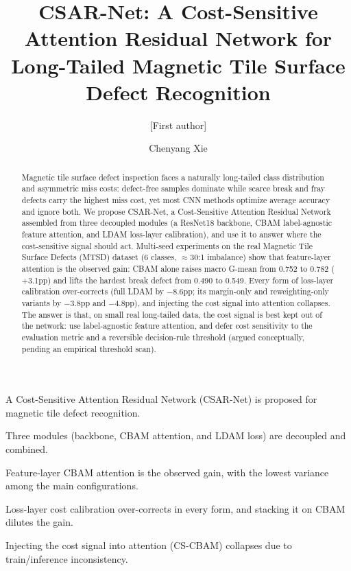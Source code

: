 \documentclass[a4paper,fleqn]{cas-sc}
\begin{document}
\begin{sloppypar}
	\let\WriteBookmarks\relax
	\def\floatpagefraction{0.7}
	\def\textfraction{0.05}
	\def\topfraction{0.85}
	\def\bottomfraction{0.85}
	\let\printorcid\relax

	\title [mode = title]{CSAR-Net: A Cost-Sensitive Attention Residual Network for Long-Tailed Magnetic Tile Surface Defect Recognition}

	\author[1]{[First author]}
	\cormark[1]

	\author[1]{Chenyang Xie}

	\address[1]{[Affiliation], China}


	\begin{abstract}
		Magnetic tile surface defect inspection faces a naturally long-tailed class distribution and asymmetric miss costs: defect-free samples dominate while scarce break and fray defects carry the highest miss cost, yet most CNN methods optimize average accuracy and ignore both. We propose CSAR-Net, a Cost-Sensitive Attention Residual Network assembled from three decoupled modules (a ResNet18 backbone, CBAM label-agnostic feature attention, and LDAM loss-layer calibration), and use it to answer where the cost-sensitive signal should act. Multi-seed experiments on the real Magnetic Tile Surface Defects (MTSD) dataset (6 classes, $\approx$30:1 imbalance) show that feature-layer attention is the observed gain: CBAM alone raises macro G-mean from 0.752 to 0.782 ($+$3.1pp) and lifts the hardest break defect from 0.490 to 0.549. Every form of loss-layer calibration over-corrects (full LDAM by $-$8.6pp; its margin-only and reweighting-only variants by $-$3.8pp and $-$4.8pp), and injecting the cost signal into attention collapses. The answer is that, on small real long-tailed data, the cost signal is best kept out of the network: use label-agnostic feature attention, and defer cost sensitivity to the evaluation metric and a reversible decision-rule threshold (argued conceptually, pending an empirical threshold scan).
	\end{abstract}

	\begin{highlights}
		\item A Cost-Sensitive Attention Residual Network (CSAR-Net) is proposed for magnetic tile defect recognition.
		\item Three modules (backbone, CBAM attention, and LDAM loss) are decoupled and combined.
		\item Feature-layer CBAM attention is the observed gain, with the lowest variance among the main configurations.
		\item Loss-layer cost calibration over-corrects in every form, and stacking it on CBAM dilutes the gain.
		\item Injecting the cost signal into attention (CS-CBAM) collapses due to train/inference inconsistency.
	\end{highlights}


\end{sloppypar}
\end{document}

